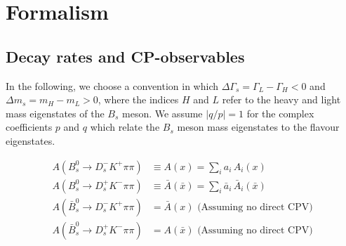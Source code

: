 \section{Formalism}

\subsection{Decay rates and CP-observables}

In the following, we choose a convention in which $\Delta\Gamma_s = \Gamma_L - \Gamma_H < 0$ and $\Delta m_s = m_H - m_L > 0$, where the indices $H$ and $L$ refer to the heavy and light mass eigenstates of the $B_s$ meson.
We assume $\vert q/p \vert = 1 $ for the complex coefficients $p$ and $q$ which relate the $B_s$ meson mass eigenstates to the flavour eigenstates.




\begin{align}
	A(B_s^0 \to D_s^{-} K^{+} \pi\pi) &\equiv A(x) = \sum_i a_i \, A_i(x)   \\
	A(B_s^0 \to D_s^{+} K^{-} \pi\pi) &\equiv \bar A(\bar x) = \sum_i \bar a_i \,\bar A_i(\bar x)    \\
	A(\bar B_s^0 \to D_s^{-} K^{+} \pi\pi) &= \bar A(x)  \, \, \text{(Assuming no direct CPV)} \\
	A(\bar B_s^0 \to D_s^{+} K^{-} \pi\pi) &= A(\bar x)  \, \, \text{(Assuming no direct CPV)} 
\end{align}


